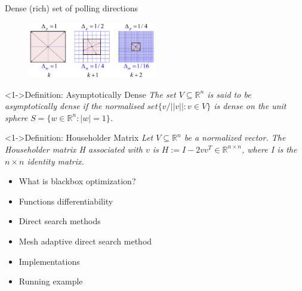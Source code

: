 \documentclass[8pt]{beamer}
\newcommand{\rd}{\color{myblue}}
\begin{document}
\begin{frame}{Dense (rich) set of polling directions}
  \begin{center}
    \begin{figure}[H]
    \includegraphics[width=0.5\textwidth]
    {Figures/Poll-Mesh.png}
    \end{figure}
  \end{center}

  \begin{block}<1->{Definition: Asymptotically Dense}
    {\it The set $V \subseteq \mathbb{R}^{n}$ is said to be asymptotically dense if the normalised $set \{v/||v||:v \in V\}$ is dense on the {\rd unit sphere} $S=\{w\in \mathbb{R}^{n} :|w|= 1\}$.}
  \end{block}

  \begin{block}<1->{Definition: Householder Matrix}
    {\it Let $V \subseteq \mathbb{R}^{n}$ be a {\rd normalized vector}. The Householder matrix H associated with $v$ is $H:=I-2vv^{T} \in \mathbb{R}^{n \times n}$, where I is the $n \times n$ {\rd identity matrix}.}
  \end{block}
\end{frame}

\begin{frame}{}
  \begin{itemize}
  \item { What is blackbox optimization?}
  \vspace{0.5cm}
  \item { Functions differentiability}
  \vspace{0.5cm}
  \item { Direct search methods}
  \vspace{0.5cm}
  \item { Mesh adaptive direct search method}
  \vspace{0.5cm}
  \item {Implementations}
  \vspace{0.5cm}
  \item { Running example}
  \end{itemize}
\end{frame}
\end{document}
